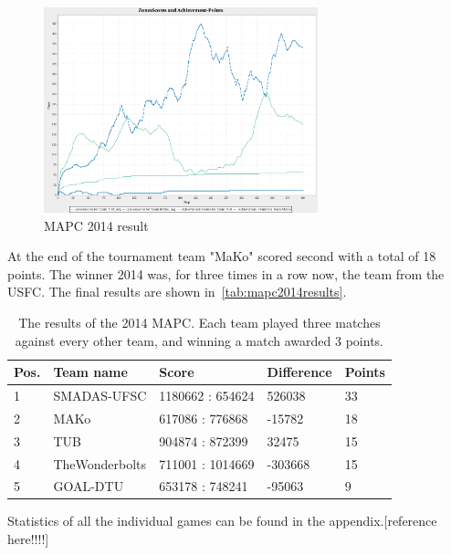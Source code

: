 \begin{figure}[h]
	\centering
	\includegraphics[width=300px]{images/ZonesScoresAndAchievementPoints.png}
	\caption{MAPC 2014 result}
	\label{dis:ZonesScoresAndAchievementPoints}
\end{figure}
At the end of the tournament team "MaKo" scored second with a total of 18 points. The winner 2014 was, for three times in a row now, the team from the USFC. The final results are shown in~\autoref{tab:mapc2014results}.
\begin{table}[h]
\centering
\caption{The results of the 2014 MAPC. Each team played three matches against every other team, and winning a match awarded 3 points.}
\label{tab:mapc2014results}
\begin{tabular}{@{}lllll@{}}
\toprule
Pos. & Team name      & Score            & Difference            & Points \\ \midrule
1    & SMADAS-UFSC    & 1180662 : 654624 & \phantom{-}526038     & 33     \\
2    & MAKo           & 617086 : 776868  & -15782                & 18     \\
3    & TUB            & 904874 : 872399  & \phantom{-}32475      & 15     \\
4    & TheWonderbolts & 711001 : 1014669 & -303668               & 15     \\
5    & GOAL-DTU       & 653178 : 748241  & -95063                & 9      \\ \bottomrule
\end{tabular}
\end{table}
Statistics of all the individual games can be found in the appendix.[reference here!!!!]

